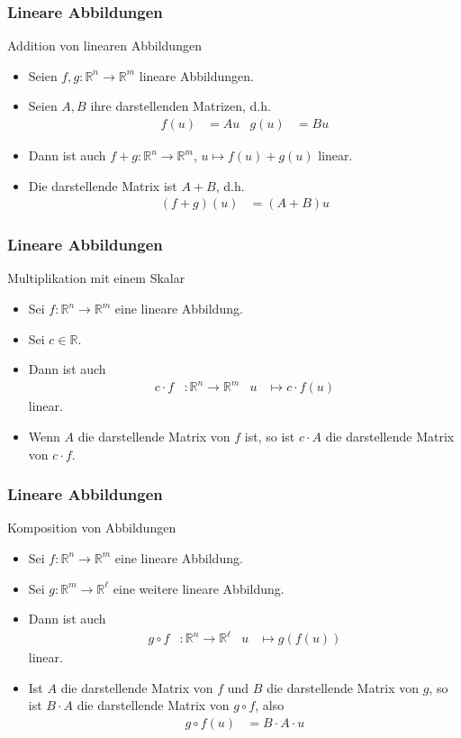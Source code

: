 \documentclass{beamer}
\newcommand\RR{\mathbb R}
\newcommand{\mytitle}{Lineare Abbildungen}
\begin{document}
\begin{frame}\frametitle{\mytitle}
	\begin{block}{Addition von linearen Abbildungen}
		\begin{itemize}
			\item Seien $f,g:\RR^n\to\RR^m$ lineare Abbildungen.
			\item Seien $A,B$ ihre darstellenden Matrizen, d.h.\
				\begin{align*}
					f(u)&=Au&g(u)&=Bu
				\end{align*}
			\item Dann ist auch $f+g:\RR^n\to\RR^m$, $u\mapsto f(u)+g(u)$ linear.
			\item Die darstellende Matrix ist $A+B$, d.h.\
				\begin{align*}
					(f+g)(u)&=(A+B)u
				\end{align*}
		\end{itemize}
	\end{block}
\end{frame}

\begin{frame}\frametitle{\mytitle}
	\begin{block}{Multiplikation mit einem Skalar}
		\begin{itemize}
			\item Sei $f:\RR^n\to\RR^m$ eine lineare Abbildung.
			\item Sei $c\in\RR$.
			\item Dann ist auch
				\begin{align*}
					c\cdot f&:\RR^n\to\RR^m&u&\mapsto c\cdot f(u)
				\end{align*}
				linear.
			\item Wenn $A$ die darstellende Matrix von $f$ ist, so ist $c\cdot A$ die darstellende Matrix von $c\cdot f$.
		\end{itemize}
	\end{block}
\end{frame}

\begin{frame}\frametitle{\mytitle}
	\begin{block}{Komposition von Abbildungen}
		\begin{itemize}
			\item Sei $f:\RR^n\to\RR^m$ eine lineare Abbildung.
			\item Sei $g:\RR^m\to\RR^\ell$ eine weitere lineare Abbildung.
			\item Dann ist auch
				\begin{align*}
					g\circ f&:\RR^n\to\RR^\ell&u&\mapsto g(f(u))
				\end{align*}
				linear.
			\item Ist $A$ die darstellende Matrix von $f$ und $B$ die darstellende Matrix von $g$, so ist $B\cdot A$ die darstellende Matrix von $g\circ f$, also
				\begin{align*}
					g\circ f(u)&=B\cdot A\cdot u
				\end{align*}
		\end{itemize}
	\end{block}
\end{frame}
\end{document}
